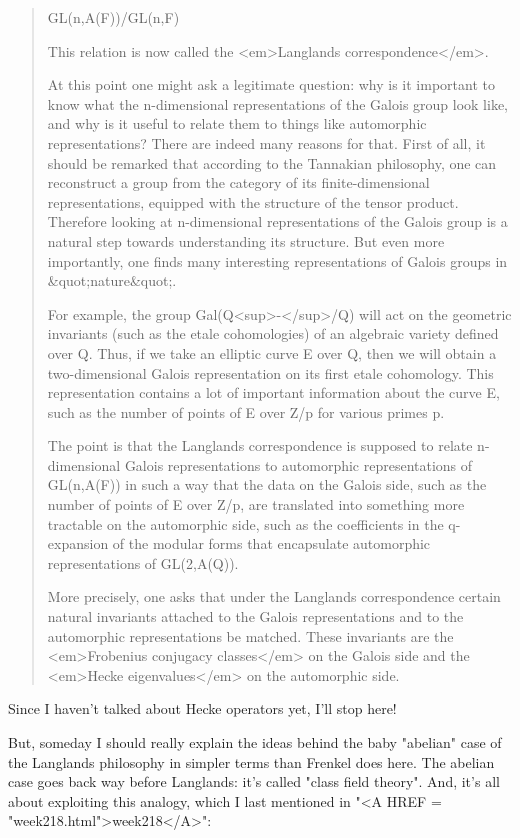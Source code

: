 \begin{quote}
  GL(n,A(F))/GL(n,F)

  This relation is now called the <em>Langlands correspondence</em>.

  At this point one might ask a legitimate question: why is it 
  important to know what the n-dimensional representations of the 
  Galois group look like, and why is it useful to relate them to 
  things like automorphic representations?  There are indeed many 
  reasons for that.  First of all, it should be remarked that 
  according to the Tannakian philosophy, one can reconstruct a 
  group from the category of its finite-dimensional representations, 
  equipped with the structure of the tensor product.  Therefore 
  looking at n-dimensional representations of the Galois group is 
  a natural step towards understanding its structure.  But even 
  more importantly, one finds many interesting representations of 
  Galois groups in &quot;nature&quot;.  

  For example, the group Gal(Q<sup>-</sup>/Q) will act on the geometric
  invariants (such as the etale cohomologies) of an algebraic variety
  defined over Q.  Thus, if we take an elliptic curve E over Q,
  then we will obtain a two-dimensional Galois representation on its
  first etale cohomology.  This representation contains a lot of
  important information about the curve E, such as the number of
  points of E over Z/p for various primes p.

  The point is that the Langlands correspondence is supposed to 
  relate n-dimensional Galois representations to automorphic 
  representations of GL(n,A(F)) in such a way that the data on 
  the Galois side, such as the number of points of E over Z/p, 
  are translated into something more tractable on the automorphic 
  side, such as the coefficients in the q-expansion of the modular 
  forms that encapsulate automorphic representations of GL(2,A(Q)).

  More precisely, one asks that under the Langlands correspondence
  certain natural invariants attached to the Galois representations 
  and to the automorphic representations be matched. These 
  invariants are the <em>Frobenius conjugacy classes</em> on the Galois 
  side and the <em>Hecke eigenvalues</em> on the automorphic side. 
\end{quote}
    

Since I haven't talked about Hecke operators yet, I'll stop here!

But, someday I should really explain the ideas behind the baby 
"abelian" case of the Langlands philosophy in simpler terms than 
Frenkel does here.  The abelian case goes back way before Langlands:
it's called "class field theory".  And, it's all about exploiting 
this analogy, which I last mentioned in "<A HREF = "week218.html">week218</A>":

